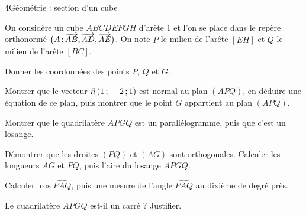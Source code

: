 \begin{exoBac}{4}{Géométrie : section d'un cube}
\begin{codecote}[0.6]
On considère un cube $ABCDEFGH$ d'arête $1$ et l'on se place dans le repère orthonormé $\big(A\,{;}\,\overrightarrow{AB},\overrightarrow{AD},\overrightarrow{AE}\big)$. On note
$P$ le milieu de l'arête $[EH]$ et $Q$ le milieu de l'arête $[BC]$.
\begin{questions}
  \item Donner les coordonnées des points $P$, $Q$ et $G$.
  \item Montrer que le vecteur $\vec n\,(1\,{;}\,-2\,{;}\,1)$ est normal au plan $(APQ)$, en déduire une équation de ce plan, puis montrer que le
    point $G$ appartient au plan $(APQ)$.
\end{questions}
\cote
\centering
{}
\end{codecote}
\begin{questions}[start=3]
  \item Montrer que le quadrilatère $APGQ$ est un parallélogramme, puis que c'est un losange.
  \item Démontrer que les droites $(PQ)$ et $(AG)$ sont orthogonales. Calculer les longueurs $AG$ et $PQ$, puis l'aire du losange $APGQ$.
  \item Calculer $\cos\widehat{PAQ}$, puis une mesure de l'angle $\widehat{PAQ}$ au dixième de degré près.
  \item Le quadrilatère $APGQ$ est-il un carré ? Justifier.
\end{questions}
\end{exoBac}

